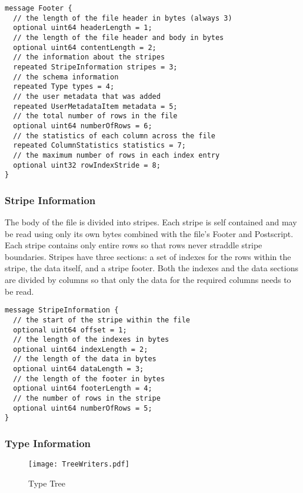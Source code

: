 \documentclass{article}
\begin{document}
\begin{verbatim}
message Footer {
  // the length of the file header in bytes (always 3)
  optional uint64 headerLength = 1;
  // the length of the file header and body in bytes
  optional uint64 contentLength = 2;
  // the information about the stripes
  repeated StripeInformation stripes = 3;
  // the schema information
  repeated Type types = 4;
  // the user metadata that was added
  repeated UserMetadataItem metadata = 5;
  // the total number of rows in the file
  optional uint64 numberOfRows = 6;
  // the statistics of each column across the file
  repeated ColumnStatistics statistics = 7;
  // the maximum number of rows in each index entry
  optional uint32 rowIndexStride = 8;
}
\end{verbatim}

\subsubsection{Stripe Information}

The body of the file is divided into stripes. Each stripe is self
contained and may be read using only its own bytes combined with the
file's Footer and Postscript. Each stripe contains only entire rows so
that rows never straddle stripe boundaries. Stripes have three
sections: a set of indexes for the rows within the stripe, the data
itself, and a stripe footer. Both the indexes and the data sections
are divided by columns so that only the data for the required columns
needs to be read.

\begin{verbatim}
message StripeInformation {
  // the start of the stripe within the file
  optional uint64 offset = 1;
  // the length of the indexes in bytes
  optional uint64 indexLength = 2;
  // the length of the data in bytes
  optional uint64 dataLength = 3;
  // the length of the footer in bytes
  optional uint64 footerLength = 4;
  // the number of rows in the stripe
  optional uint64 numberOfRows = 5;
}
\end{verbatim}

\subsubsection{Type Information}

\begin{wrapfigure}{r}{2.5in}
  \centering
  \texttt{[image: TreeWriters.pdf]}
  \caption{Type Tree}
  \label{type-tree}
  \vspace{-100pt}
\end{wrapfigure}
\end{document}
